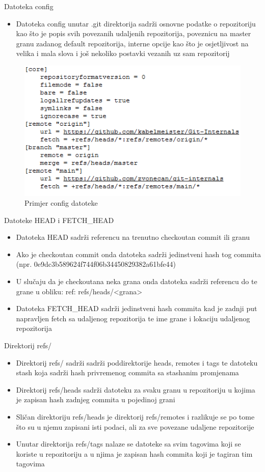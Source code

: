 \begin{frame}{Datoteka config}
	\begin{itemize}
		\item{Datoteka config unutar .git direktorija sadrži osnovne podatke o repozitoriju kao što je popis svih povezanih udaljenih repozitorija, poveznicu na master granu zadanog default repozitorija, interne opcije kao što je osjetljivost na velika i mala slova i još nekoliko postavki vezanih uz sam repozitorij}
	\end{itemize}
	\begin{figure}
		\centering
		\includegraphics[width=0.6\linewidth]{img/config.png}
		\caption{Primjer config datoteke}
	\end{figure}
\end{frame}
\begin{frame}{Datoteke HEAD i FETCH\_HEAD}
	\begin{itemize}
		\item{Datoteka HEAD sadrži referencu na trenutno checkoutan commit ili granu}
		\item{Ako je checkoutan commit onda datoteka sadrži jedinstveni hash tog commita (npr. 0e9dc3b589624f744f06b34450829382a61bfe44)}
		\item{U slučaju da je checkoutana neka grana onda datoteka sadrži referencu do te grane u obliku: ref: refs/heads/<grana>}
		\item{Datoteka FETCH\_HEAD sadrži jedinstveni hash commita kad je zadnji put napravljen fetch sa udaljenog repozitorija te ime grane i lokaciju udaljenog repozitorija}
	\end{itemize}
\end{frame}
\begin{frame}{Direktorij refs/}
	\begin{itemize}
		\item{Direktorij refs/ sadrži sadrži poddirektorije heads, remotes i tags te datoteku stash koja sadrži hash privremenog commita sa stashanim promjenama}
		\item{Direktorij refs/heads sadrži datoteku za svaku granu u repozitoriju u kojima je zapisan hash zadnjeg commita u pojedinoj grani}
		\item{Sličan direktoriju refs/heads je direktorij refs/remotes i razlikuje se po tome što su u njemu zapisani isti podaci, ali za sve povezane udaljene repozitorije}
		\item{Unutar direktorija refs/tags nalaze se datoteke sa svim tagovima koji se koriste u repozitoriju a u njima je zapisan hash commita koji je tagiran tim tagovima}
	\end{itemize}
\end{frame}

